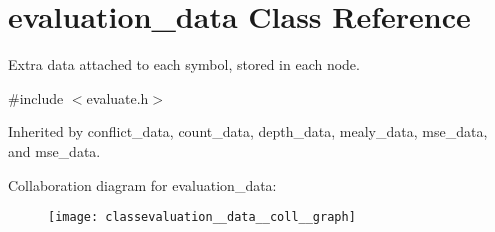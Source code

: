 \hypertarget{classevaluation__data}{}\section{evaluation\+\_\+data Class Reference}
\label{classevaluation__data}


Extra data attached to each symbol, stored in each node.  




{\ttfamily \#include $<$evaluate.\+h$>$}



Inherited by conflict\+\_\+data, count\+\_\+data, depth\+\_\+data, mealy\+\_\+data, mse\+\_\+data, and mse\+\_\+data.



Collaboration diagram for evaluation\+\_\+data\+:
\nopagebreak
\begin{figure}[H]
\begin{center}
\leavevmode
\texttt{[image: classevaluation\_\_data\_\_coll\_\_graph]}
\end{center}
\end{figure}
